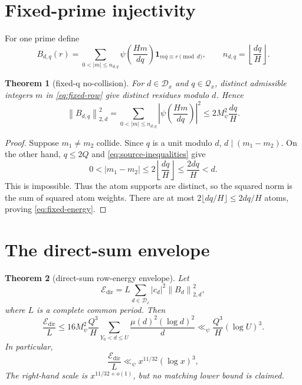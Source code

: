 \documentclass[11pt]{article}
\newtheorem{theorem}{Theorem}[section]
\theoremstyle{definition}
\theoremstyle{remark}
\newcommand{\Qx}{\mathcal Q_x}
\newcommand{\Dx}{\mathcal D_x}
\newcommand{\one}{\mathbf 1}
\newcommand{\Edir}{\mathcal E_{\mathrm{dir}}}
\newcommand{\norm}[1]{\left\lVert #1\right\rVert}
\begin{document}
\section{Fixed-prime injectivity}

For one prime define
\begin{equation}
 B_{d,q}(r)=\sum_{0<|m|\le n_{d,q}}
 \psi\!\left(\frac{Hm}{dq}\right)
 \one_{m\overline q\equiv r\pmod d},
 \qquad n_{d,q}=\left\lfloor\frac{dq}{H}\right\rfloor.
 \label{eq:fixed-row}
\end{equation}

\begin{theorem}[fixed-q no-collision]
\label{thm:no-collision}
For \(d\in\Dx\) and \(q\in\Qx\), distinct admissible integers \(m\) in
\eqref{eq:fixed-row} give distinct residues modulo \(d\).  Hence
\begin{equation}
 \norm{B_{d,q}}_{2,d}^2
 =\sum_{0<|m|\le n_{d,q}}
 \left|\psi\!\left(\frac{Hm}{dq}\right)\right|^2
 \le 2M_\psi^2\frac{dq}{H}.
 \label{eq:fixed-energy}
\end{equation}
\end{theorem}

\begin{proof}
Suppose \(m_1\ne m_2\) collide.  Since \(q\) is a unit modulo \(d\),
\(d\mid(m_1-m_2)\).  On the other hand, \(q\le2Q\) and \eqref{eq:source-inequalities}
give
\[
0<|m_1-m_2|\le2\left\lfloor\frac{dq}{H}\right\rfloor
 \le\frac{2dq}{H}<d.
\]
This is impossible.  Thus the atom supports are distinct, so the squared
norm is the sum of squared atom weights.  There are at most
\(2\lfloor dq/H\rfloor\le2dq/H\) atoms, proving \eqref{eq:fixed-energy}.
\end{proof}

\section{The direct-sum envelope}

\begin{theorem}[direct-sum row-energy envelope]
\label{thm:envelope}
Let
\begin{equation}
 \Edir=L\sum_{d\in\Dx}|c_d|^2\norm{B_d}_{2,d}^2,
 \label{eq:direct-energy}
\end{equation}
where \(L\) is a complete common period.  Then
\begin{equation}
 \frac{\Edir}{L}
 \le 16M_\psi^2\frac{Q^3}{H}
 \sum_{Y_0<d\le U}\frac{\mu(d)^2(\log d)^2}{d}
 \ll_{\psi}\frac{Q^3}{H}(\log U)^3.
 \label{eq:envelope}
\end{equation}
In particular,
\begin{equation}
 \frac{\Edir}{L}\ll_{\psi}x^{11/32}(\log x)^3,
 \label{eq:exponent}
\end{equation}
The right-hand scale is \(x^{11/32+o(1)}\), but no matching lower bound is
claimed.
\end{theorem}
\end{document}
